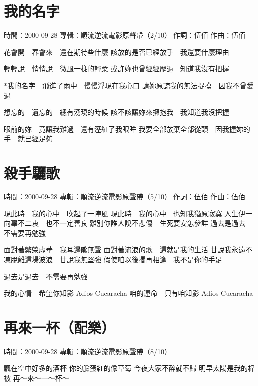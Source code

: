\documentclass[UTF8,a4paper,oneside,twocolumn,12pt]{ctexbook}
\newcommand{\infopair}[2]{\textbullet #1：#2}
\newcommand{\zc}[1][伍佰]{\infopair{作詞}{#1}}
\newcommand{\zq}[1][伍佰]{\infopair{作曲}{#1}}
\newcommand{\zj}[1]{\infopair{專輯}{#1}}
\newcommand{\sj}[1]{\infopair{時間}{#1}}
\newenvironment{info}{\begin{flushleft}\kaishu
	}
	{\end{flushleft}\normalsize\yahei\par}
\newenvironment{lyric}{
	}
{}
\begin{document}
\section{我的名字}
\begin{info}
	\sj{2000-09-28}
	\zj{順流逆流電影原聲帶（2/10）}
	\zc
	\zq
\end{info}
\begin{lyric}
	花會開　春會來　還在期待些什麼
	該放的是否已經放手　我還要什麼理由

	輕輕說　悄悄說　微風一樣的輕柔
	或許妳也曾經經歷過　知道我沒有把握

	*我的名字　飛進了雨中　慢慢浮現在我心口
	請妳原諒我的無法捉摸　因我不曾愛過

	想忘的　遺忘的　總有湧現的時候
	該不該讓妳來擁抱我　我知道我沒把握

	眼前的妳　竟讓我難過　還有溼紅了我眼眸
	我要全部放棄全部從頭　因我握妳的手　就已經足夠
\end{lyric}

\section{殺手驪歌}
\begin{info}
	\sj{2000-09-28}
	\zj{順流逆流電影原聲帶（5/10）}
	\zc
	\zq
\end{info}
\begin{lyric}
	現此時　我的心中　吹起了一陣風
	現此時　我的心中　也知我猶原寂寞
	人生伊一向辜不二衷　也不一定善良
	離別你誰人說不悲傷　生死要安怎參詳
	過去是過去　不需要再勉強

	面對著繁榮虛華　我耳邊隴無聲
	面對著流浪的歌　這就是我的生活
	甘說我永遠不凍脫離這場波浪　甘說我無堅強
	假使咱以後擱再相逢　我不是你的手足

	過去是過去　不需要再勉強

	我的心情　希望你知影 Adios Cucaracha
	咱的運命　只有咱知影 Adios Cucaracha
\end{lyric}

\section{再來一杯（配樂）}
\begin{info}
	\sj{2000-09-28}
	\zj{順流逆流電影原聲帶（8/10）}
\end{info}
\begin{lyric}
	飄在空中好多的酒杯
	你的臉蛋紅的像草莓
	今夜大家不醉就不歸
	明早太陽是我的棉被
	再～來～一～杯～
\end{lyric}
\end{document}
